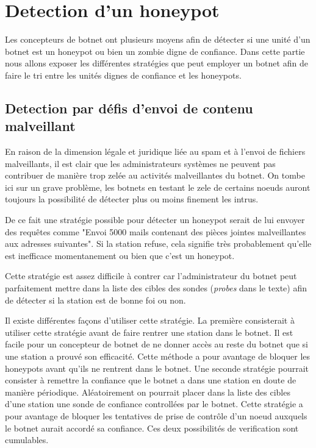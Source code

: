 \section{Detection d'un honeypot}

Les concepteurs de botnet ont plusieurs moyens afin de détecter si
une unité d'un botnet est un honeypot ou bien un zombie digne de confiance.
Dans cette partie nous allons exposer les différentes stratégies que peut employer
un botnet afin de faire le tri entre les unités dignes de confiance et les honeypots.

\subsection{Detection par défis d'envoi de contenu malveillant}

En raison de la dimension légale et juridique liée au spam et à l'envoi de fichiers malveillants,
il est clair que les administrateurs systèmes ne peuvent pas contribuer de manière trop zelée au
activités malveillantes du botnet. On tombe ici sur un grave problème, les botnets en testant le
zele de certains noeuds auront toujours la possibilité de détecter plus ou moins finement les intrus.

De ce fait une stratégie possible pour détecter un honeypot serait de lui envoyer des requêtes comme
"Envoi 5000 mails contenant des pièces jointes malveillantes aux adresses suivantes". Si la 
station refuse, cela signifie très probablement
qu'elle est inefficace momentanement ou bien que c'est un honeypot.

Cette stratégie est assez difficile à contrer car l'administrateur du botnet peut parfaitement mettre dans la
liste des cibles des sondes (\textit{probes} dans le texte) afin de détecter si la station est de bonne foi
ou non.

Il existe différentes façons d'utiliser cette stratégie.
La première consisterait à utiliser cette stratégie avant de faire rentrer une station dans le botnet.
Il est facile pour un concepteur de botnet de ne donner accès au reste du botnet que si une station
a prouvé son efficacité. Cette méthode a pour avantage de bloquer les honeypots avant qu'ils ne rentrent
dans le botnet.
Une seconde stratégie pourrait consister à remettre la confiance que le botnet a dans une station en doute
de manière périodique. Aléatoirement on pourrait placer dans la liste des cibles d'une station une sonde
de confiance controllées par le botnet. Cette stratégie a pour avantage de bloquer les tentatives de prise
de contrôle d'un noeud auxquels le botnet aurait accordé sa confiance.
Ces deux possibilités de verification sont cumulables.

